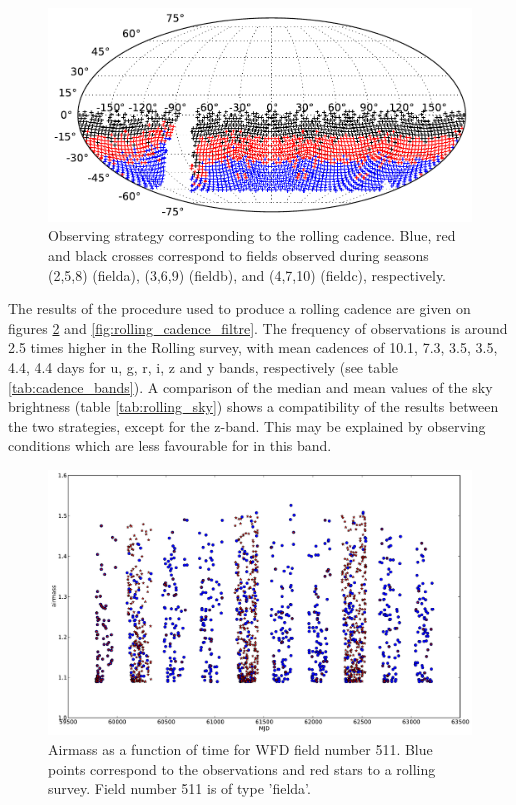 \documentclass[\docopts]{\docclass}
\begin{document}
\begin{figure}[t]
  \begin{center}
    \includegraphics[width=\linewidth]{figures/Rolling_fields.pdf}
    \caption{Observing strategy corresponding to the rolling
      cadence. Blue, red and black crosses correspond to fields
      observed during seasons (2,5,8) (fielda), (3,6,9) (fieldb), and
      (4,7,10) (fieldc), respectively.}
    \label{fig:rolling_strategy}
  \end{center}
\end{figure}


The results of the procedure used to produce a rolling cadence are
given on figures \ref{fig:rolling_airmass} and
\ref{fig:rolling_cadence_filtre}. The frequency of observations is around 2.5 times higher
in the Rolling survey, with mean cadences of 10.1, 7.3, 3.5, 3.5, 4.4,
4.4 days for u, g, r, i, z and y bands,
respectively (see table \ref{tab:cadence_bands}). A comparison of the
median and mean values of the sky brightness (table
\ref{tab:rolling_sky}) shows a compatibility of the results between
the two strategies, except for the z-band. This may be explained by
observing conditions which are less favourable for 
in this band. 


\begin{figure}[t]
  \begin{center}
    \includegraphics[width=\linewidth]{figures/Airmass_vs_mjd_511.pdf}
    \caption{Airmass as a function of time for WFD field number
      511. Blue points correspond to the 
      observations and red stars to a rolling survey. Field number 511
    is of type 'fielda'.}
    \label{fig:rolling_airmass}
  \end{center}
\end{figure}
\end{document}
